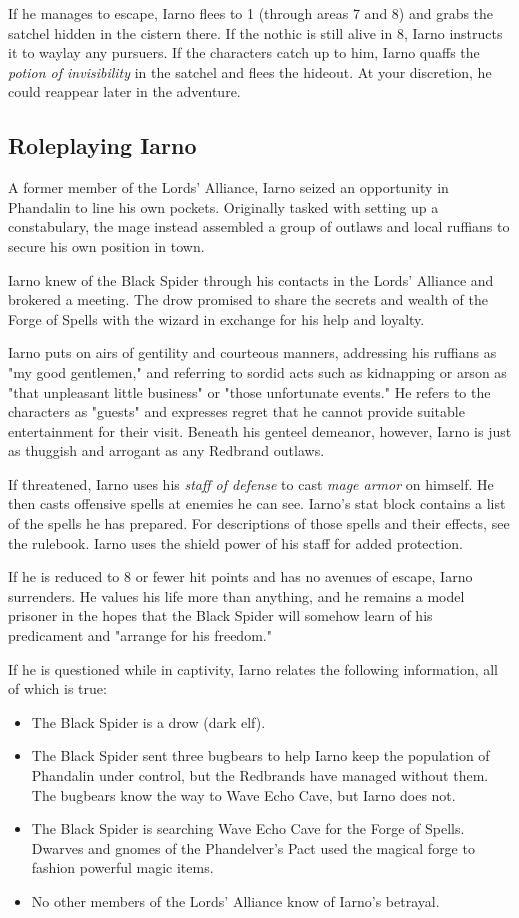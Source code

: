 \documentclass[10pt,a4paper,twoside,bg=print,twocolumn,openany,nodeprecatedcode]{dndbook}
\begin{document}
If he manages to escape, Iarno flees to 1 (through areas 7 and 8) and grabs the satchel hidden in the cistern there. If the nothic is still alive in 8, Iarno instructs it to waylay any pursuers. If the characters catch up to him, Iarno quaffs the \textit{potion of invisibility} in the satchel and flees the hideout. At your discretion, he could reappear later in the adventure.

\subsection{Roleplaying Iarno}
A former member of the Lords' Alliance, Iarno seized an opportunity in Phandalin to line his own pockets. Originally tasked with setting up a constabulary, the mage instead assembled a group of outlaws and local ruffians to secure his own position in town.

Iarno knew of the Black Spider through his contacts in the Lords' Alliance and brokered a meeting. The drow promised to share the secrets and wealth of the Forge of Spells with the wizard in exchange for his help and loyalty.

Iarno puts on airs of gentility and courteous manners, addressing his ruffians as "my good gentlemen," and referring to sordid acts such as kidnapping or arson as "that unpleasant little business" or "those unfortunate events." He refers to the characters as "guests" and expresses regret that he cannot provide suitable entertainment for their visit. Beneath his genteel demeanor, however, Iarno is just as thuggish and arrogant as any Redbrand outlaws.

If threatened, Iarno uses his \textit{staff of defense} to cast \textit{mage armor} on himself. He then casts offensive spells at enemies he can see. Iarno's stat block contains a list of the spells he has prepared. For descriptions of those spells and their effects, see the rulebook. Iarno uses the shield power of his staff for added protection.

If he is reduced to 8 or fewer hit points and has no avenues of escape, Iarno surrenders. He values his life more than anything, and he remains a model prisoner in the hopes that the Black Spider will somehow learn of his predicament and "arrange for his freedom."

If he is questioned while in captivity, Iarno relates the following information, all of which is true:


\begin{itemize}
\item The Black Spider is a drow (dark elf).
\item The Black Spider sent three bugbears to help Iarno keep the population of Phandalin under control, but the Redbrands have managed without them. The bugbears know the way to Wave Echo Cave, but Iarno does not.
\item The Black Spider is searching Wave Echo Cave for the Forge of Spells. Dwarves and gnomes of the Phandelver's Pact used the magical forge to fashion powerful magic items.
\item No other members of the Lords' Alliance know of Iarno's betrayal.
\end{itemize}
\end{document}
